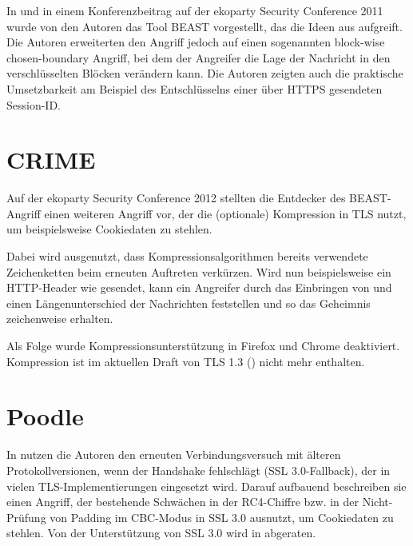 In \cite{duong11} und in einem Konferenzbeitrag auf der ekoparty Security Conference 2011 wurde von den Autoren das Tool BEAST vorgestellt, das die Ideen aus \cite{bard04} aufgreift. Die Autoren erweiterten den Angriff jedoch auf einen sogenannten block-wise chosen-boundary Angriff, bei dem der Angreifer die Lage der Nachricht in den verschlüsselten Blöcken verändern kann. Die Autoren zeigten auch die praktische Umsetzbarkeit am Beispiel des Entschlüsselns einer über HTTPS gesendeten Session-ID.

\section{CRIME}

\label{sec_attack_crime}

Auf der ekoparty Security Conference 2012 stellten die Entdecker des BEAST-Angriff einen weiteren Angriff vor, der die (optionale) Kompression in TLS nutzt, um beispielsweise Cookiedaten zu stehlen. 

Dabei wird ausgenutzt, dass Kompressionsalgorithmen bereits verwendete Zeichenketten beim erneuten Auftreten verkürzen. Wird nun beispielsweise ein HTTP-Header wie  gesendet, kann ein Angreifer durch das Einbringen von  und  einen Längenunterschied der Nachrichten feststellen und so das Geheimnis zeichenweise erhalten.

Als Folge wurde Kompressionsunterstützung in Firefox und Chrome deaktiviert. Kompression ist im aktuellen Draft von TLS 1.3 (\cite{tls13}) nicht mehr enthalten.

\section{Poodle}

In \cite{moeller14} nutzen die Autoren den erneuten Verbindungsversuch mit älteren Protokollversionen, wenn der Handshake fehlschlägt (SSL 3.0-Fallback), der in vielen TLS-Implementierungen eingesetzt wird. Darauf aufbauend beschreiben sie einen Angriff, der bestehende Schwächen in der RC4-Chiffre  bzw. in der Nicht-Prüfung von Padding im CBC-Modus in SSL 3.0 ausnutzt, um Cookiedaten zu stehlen.
Von der Unterstützung von SSL 3.0 wird in \cite{deprecate_ssl30} abgeraten.

